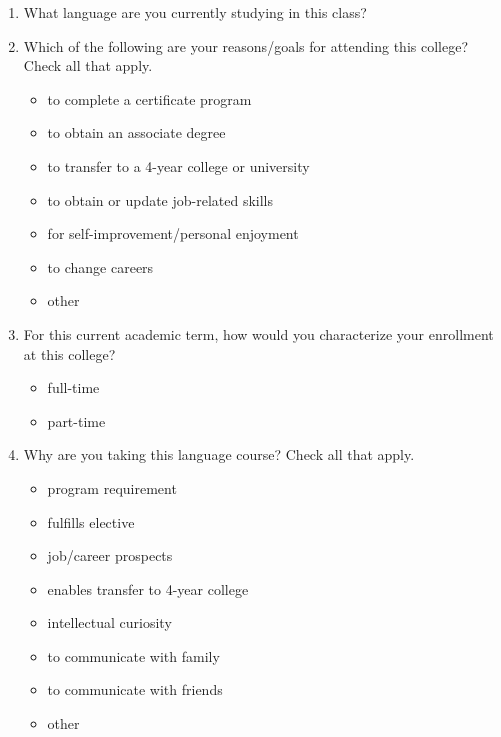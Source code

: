 \documentclass[letterpaper,10pt]{article}
\begin{document}
\begin{enumerate}
\item What language are you currently studying in this class? \underline{\hspace{2.5in}}

\item Which of the following are your reasons/goals for attending this college? Check all that apply.
\vspace{-0.1in}\begin{multicols}{2}
\begin{itemize}
	\item to complete a certificate program
	\item to obtain an associate degree
	\item to transfer to a 4-year college or university
	\item to obtain or update job-related skills
	\item for self-improvement/personal enjoyment
	\item to change careers
	\item other \underline{\hspace{2in}}
\end{itemize}
\end{multicols}

\item For this current academic term, how would you characterize your enrollment at this college?
\vspace{-0.1in}\begin{multicols}{2}
\begin{itemize}
	\item full-time
	\item part-time
\end{itemize}
\end{multicols}

\item Why are you taking this language course? Check all that apply.
\vspace{-0.1in}\begin{multicols}{2}
\begin{itemize}
	\item program requirement
	\item fulfills elective
	\item job/career prospects
	\item enables transfer to 4-year college
	\item intellectual curiosity
	\item to communicate with family
	\item to communicate with friends
	\item other \underline{\hspace{2in}}
\end{itemize}
\end{multicols}


\end{enumerate}
\end{document}
